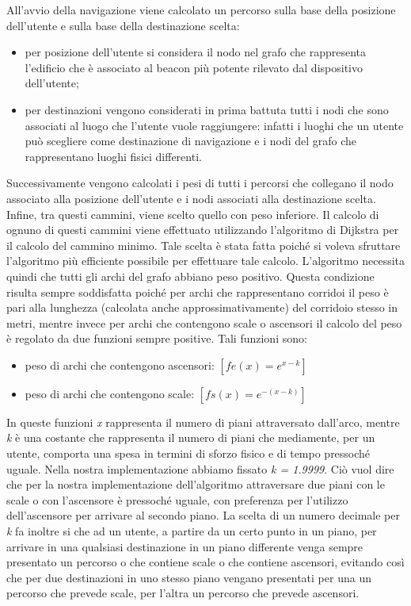 \documentclass[../SperimentazioniPratiche.tex]{subfiles}
\begin{document}
		All'avvio della navigazione viene calcolato un percorso sulla base della posizione dell'utente e sulla base della destinazione scelta:
		\begin{itemize} 
			\item per posizione dell'utente si considera il nodo nel grafo che rappresenta l'edificio che è associato al beacon più potente rilevato dal dispositivo dell'utente;
			\item per destinazioni vengono considerati in prima battuta tutti i nodi che sono associati al luogo che l'utente vuole raggiungere: infatti i luoghi che un utente può scegliere come destinazione di navigazione e i nodi del grafo che rappresentano luoghi fisici differenti.
		\end{itemize}
		Successivamente vengono calcolati i pesi di tutti i percorsi che collegano il nodo associato alla posizione dell'utente e i nodi associati alla destinazione scelta. Infine, tra questi cammini, viene scelto quello con peso inferiore. Il calcolo di ognuno di questi cammini viene effettuato utilizzando l'algoritmo di Dijkstra per il calcolo del cammino minimo. Tale scelta è stata fatta poiché si voleva sfruttare l'algoritmo più efficiente possibile per effettuare tale calcolo. L'algoritmo necessita quindi che tutti gli archi del grafo abbiano peso positivo. Questa condizione risulta sempre soddisfatta poiché per archi che rappresentano corridoi il peso è pari alla lunghezza (calcolata anche approssimativamente) del corridoio stesso in metri, mentre invece per archi che contengono scale o ascensori il calcolo del peso è regolato da due funzioni sempre positive. Tali funzioni sono:
		\begin{itemize}
			\item peso di archi che contengono ascensori: $[fe(x) = e^{x-k}]$
			\item peso di archi che contengono scale: $[fs(x) = e^{-(x-k)}]$
		\end{itemize}
		In queste funzioni \textit{x} rappresenta il numero di piani attraversato dall'arco, mentre \textit{k} è una costante che rappresenta il numero di piani che mediamente, per un utente, comporta una spesa in termini di sforzo fisico e di tempo pressoché uguale. Nella nostra implementazione abbiamo fissato \textit{k = 1.9999}. Ciò vuol dire che per la nostra implementazione dell'algoritmo attraversare due piani con le scale o con l'ascensore è pressoché uguale, con preferenza per l'utilizzo dell'ascensore per arrivare al secondo piano.
		La scelta di un numero decimale per \textit{k} fa inoltre si che ad un utente, a partire da un certo punto in un piano, per arrivare in una qualsiasi destinazione in un piano differente venga sempre presentato un percorso o che contiene scale o che contiene ascensori, evitando così che per due destinazioni in uno stesso piano vengano presentati per una un percorso che prevede scale, per l'altra un percorso che prevede ascensori.
		
\end{document}
